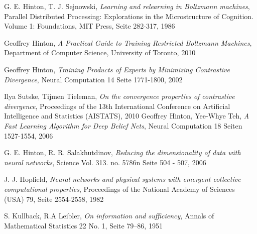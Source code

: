 \documentclass[12pt]{article}
\begin{document}
\newpage
\begin{thebibliography}{9}

G. E. Hinton, T. J. Sejnowski,
\emph{Learning and relearning in Boltzmann machines}, 
Parallel Distributed Processing: Explorations in the Microstructure of Cognition. Volume 1: Foundations, MIT Press, Seite 282-317, 1986

Geoffrey Hinton,
\emph{A Practical Guide to Training Restricted Boltzmann Machines},
Department of Computer Science, 
University of Toronto,
2010

Geoffrey Hinton,
\emph{Training Products of Experts by Minimizing Contrastive Divergence},
Neural Computation 14 Seite 1771-1800,
2002

Ilya Sutske, Tijmen Tieleman,
\emph{On the convergence properties of contrastive divergence},
Proceedings of the 13th International Conference on Artificial Intelligence and Statistics (AISTATS),
2010 
Geoffrey Hinton, Yee-Whye Teh,
\emph{A Fast Learning Algorithm for Deep Belief Nets},
Neural Computation 18 Seiten 1527-1554,
2006

G. E. Hinton, R. R. Salakhutdinov,
\emph{Reducing the dimensionality of data with neural networks},
Science Vol. 313. no. 5786n Seite 504 - 507,
2006

J. J. Hopfield,
 \emph{Neural networks and physical systems with emergent collective computational properties},
Proceedings of the National Academy of Sciences (USA) 79, Seite 2554-2558,
1982

 S. Kullback, R.A Leibler,
\emph{On information and sufficiency},
Annals of Mathematical Statistics 22 No. 1,
Seite  79–86,
 1951
\end{thebibliography}
\newpage
\listoffigures
\end{document}
